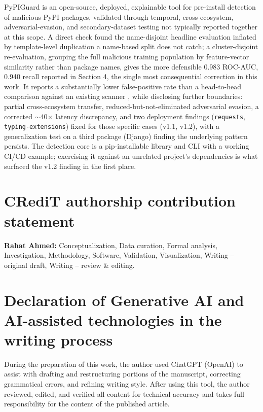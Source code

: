 \documentclass[preprint,12pt, a4paper]{elsarticle}
\begin{document}
\begin{enumerate}
PyPIGuard is an open-source, deployed, explainable tool for pre-install detection of malicious PyPI packages, validated through temporal, cross-ecosystem, adversarial-evasion, and secondary-dataset testing not typically reported together at this scope. A direct check found the name-disjoint headline evaluation inflated by template-level duplication a name-based split does not catch; a cluster-disjoint re-evaluation, grouping the full malicious training population by feature-vector similarity rather than package names, gives the more defensible 0.983 ROC-AUC, 0.940 recall reported in Section 4, the single most consequential correction in this work. It reports a substantially lower false-positive rate than a head-to-head comparison against an existing scanner \cite{guarddog}, while disclosing further boundaries: partial cross-ecosystem transfer, reduced-but-not-eliminated adversarial evasion, a corrected $\sim$40$\times$ latency discrepancy, and two deployment findings (\texttt{requests}, \texttt{typing-extensions}) fixed for those specific cases (v1.1, v1.2), with a generalization test on a third package (Django) finding the underlying pattern persists. The detection core is a pip-installable library and CLI with a working CI/CD example; exercising it against an unrelated project's dependencies is what surfaced the v1.2 finding in the first place.

\end{enumerate}

\section*{CRediT authorship contribution statement}
\label{}

\textbf{Rahat Ahmed:} Conceptualization, Data curation, Formal analysis, Investigation, Methodology, Software, Validation, Visualization, Writing -- original draft, Writing -- review \& editing.

\section*{Declaration of Generative AI and AI-assisted technologies in the writing process}
\label{}

During the preparation of this work, the author used ChatGPT (OpenAI) to assist with drafting and restructuring portions of the manuscript, correcting grammatical errors, and refining writing style. After using this tool, the author reviewed, edited, and verified all content for technical accuracy and takes full responsibility for the content of the published article.
\end{document}
